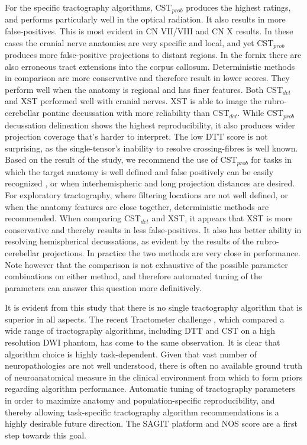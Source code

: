For the specific tractography algorithms, CST$_{prob}$ produces the highest ratings, and performs particularly well in the optical radiation. It also results in more false-positives. This is most evident in CN VII/VIII and CN X results. In these cases the cranial nerve anatomies are very specific and local, and yet CST$_{prob}$ produces more false-positive projections to distant regions. In the fornix there are also erroneous tract extensions into the corpus callosum. Deterministic methods in comparison are more conservative and therefore result in lower scores. They perform well when the anatomy is regional and has finer features. Both CST$_{det}$ and XST performed well with cranial nerves. XST is able to image the rubro-cerebellar pontine decussation with more reliability than CST$_{det}$. While CST$_{prob}$ decussation delineation shows the highest reproducibility, it also produces wider projection coverage that’s harder to interpret. The low DTT score is not surprising, as the single-tensor's inability to resolve crossing-fibres is well known. Based on the result of the study, we recommend the use of CST$_{prob}$ for tasks in which the target anatomy is well defined and false positively can be easily recognized , or when interhemispheric and long projection distances are desired. For exploratory tractography, where filtering locations are not well defined, or when the anatomy features are close together, deterministic methods are recommended. When comparing CST$_{det}$ and XST, it appears that XST is more conservative and thereby results in less false-positives. It also has better ability in resolving hemispherical decussations, as evident by the results of the rubro-cerebellar projections. In practice the two methods are very close in performance. Note however that the comparison is not exhaustive of the possible parameter combinations on either method, and therefore automated tuning of the parameters can answer this question more definitively. 

It is evident from this study that there is no single tractography algorithm that is superior in all aspects. The recent Tractometer challenge \cite{Neher2015}, which compared a wide range of tractography algorithms, including DTT and CST on a high resolution DWI phantom, has come to the same observation. It is clear that algorithm choice is highly task-dependent. Given that vast number of neuropathologies are not well understood, there is often no available ground truth of neuroanatomical measure in the clinical environment from which to form priors regarding algorithm performance.  Automatic tuning of tractography parameters in order to maximize anatomy and population-specific reproducibility, and thereby allowing task-specific tractography algorithm recommendations is a highly desirable future direction. The SAGIT platform and NOS score are a first step towards this goal. 


